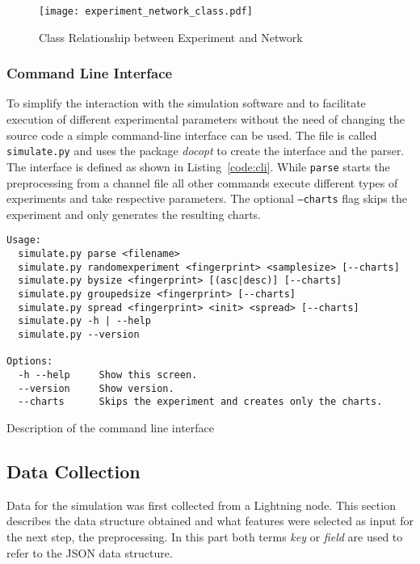 \documentclass[final]{fhnwreport}       %
\begin{document}
\begin{figure}[H]
\centering
\texttt{[image: experiment\_network\_class.pdf]}
\caption{Class Relationship between Experiment and Network}
\label{fig:experiment_class}
\end{figure}

\subsubsection{Command Line Interface}
To simplify the interaction with the simulation software and to facilitate execution of different experimental parameters without the need of changing the source code a simple command-line interface can be used. The file is called \texttt{simulate.py} and uses the package \emph{docopt} to create the interface and the parser. The interface is defined as shown in Listing~\ref{code:cli}. While \texttt{parse} starts the preprocessing from a channel file all other commands execute different types of experiments and take respective parameters. The optional \texttt{---charts} flag skips the experiment and only generates the resulting charts.

\begin{listing}[H]
  \begin{verbatim}
Usage:
  simulate.py parse <filename>
  simulate.py randomexperiment <fingerprint> <samplesize> [--charts]
  simulate.py bysize <fingerprint> [(asc|desc)] [--charts]
  simulate.py groupedsize <fingerprint> [--charts]
  simulate.py spread <fingerprint> <init> <spread> [--charts]
  simulate.py -h | --help
  simulate.py --version

Options:
  -h --help     Show this screen.
  --version     Show version.
  --charts      Skips the experiment and creates only the charts.

\end{verbatim}
\caption{Description of the command line interface}
\label{code:cli}
\end{listing}

\subsection{Data Collection}\label{subsec:datacol}
Data for the simulation was first collected from a Lightning node. This section describes the data structure obtained and what features were selected as input for the next step, the preprocessing. In this part both terms \emph{key} or \emph{field} are used to refer to the JSON data structure. 
\end{document}
